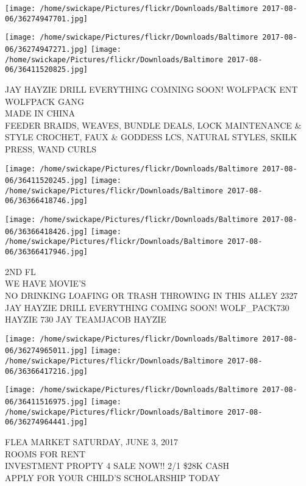 \documentclass[10pt,letterpaper]{article}
\begin{document}
\texttt{[image: /home/swickape/Pictures/flickr/Downloads/Baltimore 2017-08-06/36274947701.jpg]}

\vspace{0.25in}
\texttt{[image: /home/swickape/Pictures/flickr/Downloads/Baltimore 2017-08-06/36274947271.jpg]}
\texttt{[image: /home/swickape/Pictures/flickr/Downloads/Baltimore 2017-08-06/36411520825.jpg]}

JAY HAYZIE DRILL EVERYTHING COMNING SOON!  WOLFPACK ENT WOLFPACK GANG\\
MADE IN CHINA\\
FEEDER BRAIDS, WEAVES, BUNDLE DEALS, LOCK MAINTENANCE \& STYLE CROCHET, FAUX \& GODDESS LCS, NATURAL STYLES, SKILK PRESS, WAND CURLS\\
\pagebreak

\texttt{[image: /home/swickape/Pictures/flickr/Downloads/Baltimore 2017-08-06/36411520245.jpg]}
\texttt{[image: /home/swickape/Pictures/flickr/Downloads/Baltimore 2017-08-06/36366418746.jpg]}

\texttt{[image: /home/swickape/Pictures/flickr/Downloads/Baltimore 2017-08-06/36366418426.jpg]}
\texttt{[image: /home/swickape/Pictures/flickr/Downloads/Baltimore 2017-08-06/36366417946.jpg]}

2ND FL\\
WE HAVE MOVIE'S\\
NO DRINKING LOAFING OR TRASH THROWING IN THIS ALLEY 2327\\
JAY HAYZIE DRILL EVERYTHING COMING SOON! WOLF\_PACK730 HAYZIE 730 JAY TEAMJACOB HAYZIE\\
\pagebreak

\texttt{[image: /home/swickape/Pictures/flickr/Downloads/Baltimore 2017-08-06/36274965011.jpg]}
\texttt{[image: /home/swickape/Pictures/flickr/Downloads/Baltimore 2017-08-06/36366417216.jpg]}

\texttt{[image: /home/swickape/Pictures/flickr/Downloads/Baltimore 2017-08-06/36411516975.jpg]}
\texttt{[image: /home/swickape/Pictures/flickr/Downloads/Baltimore 2017-08-06/36274964441.jpg]}

FLEA MARKET SATURDAY, JUNE 3, 2017\\
ROOMS FOR RENT\\
INVESTMENT PROPTY 4 SALE NOW!! 2/1 \$28K CASH\\
APPLY FOR YOUR CHILD'S SCHOLARSHIP TODAY\\
\pagebreak
\end{document}
